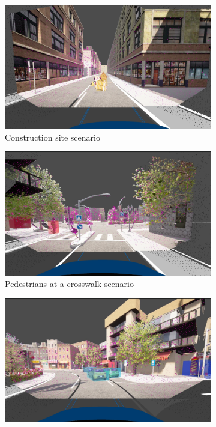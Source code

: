 \begin{figure}
    \centering
    \begin{subfigure}[b]{0.45\textwidth}
        \centering
        \includegraphics[width=\textwidth]{figures/scenario_cons.png}
        \caption{Construction site scenario}
        \label{fig:scenario_construction}
    \end{subfigure}
    \hfill
    \begin{subfigure}[b]{0.45\textwidth}
        \centering
        \includegraphics[width=\textwidth]{figures/scenario_cross.png}
        \caption{Pedestrians at a crosswalk scenario}
        \label{fig:scenario_crosswalk}
    \end{subfigure}
    \newline
    \begin{subfigure}[b]{0.45\textwidth}
        \centering
        \includegraphics[width=\textwidth]{figures/scenario_srp.png}

\end{subfigure}
\end{figure}
